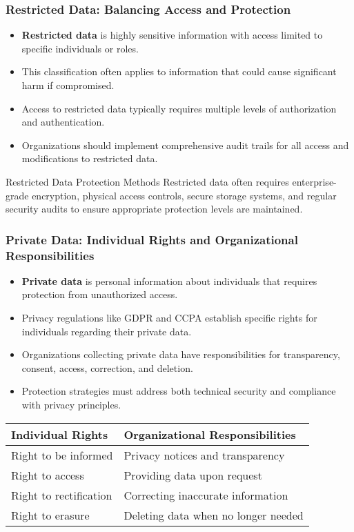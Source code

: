 \documentclass{beamer}
\begin{document}
\begin{frame}
\frametitle{Restricted Data: Balancing Access and Protection}
\begin{itemize}
\item \textbf{Restricted data} is highly sensitive information with access limited to specific individuals or roles.
\item This classification often applies to information that could cause significant harm if compromised.
\item Access to restricted data typically requires multiple levels of authorization and authentication.
\item Organizations should implement comprehensive audit trails for all access and modifications to restricted data.
\end{itemize}

\begin{exampleblock}{Restricted Data Protection Methods}
Restricted data often requires enterprise-grade encryption, physical access controls, secure storage systems, and regular security audits to ensure appropriate protection levels are maintained.
\end{exampleblock}
\end{frame}

\begin{frame}
\frametitle{Private Data: Individual Rights and Organizational Responsibilities}
\begin{itemize}
\item \textbf{Private data} is personal information about individuals that requires protection from unauthorized access.
\item Privacy regulations like GDPR and CCPA establish specific rights for individuals regarding their private data.
\item Organizations collecting private data have responsibilities for transparency, consent, access, correction, and deletion.
\item Protection strategies must address both technical security and compliance with privacy principles.
\end{itemize}

\begin{table}
\begin{tabular}{|l|l|}
\hline
\textbf{Individual Rights} & \textbf{Organizational Responsibilities} \\
\hline
Right to be informed & Privacy notices and transparency \\
\hline
Right to access & Providing data upon request \\
\hline
Right to rectification & Correcting inaccurate information \\
\hline
Right to erasure & Deleting data when no longer needed \\
\hline
\end{tabular}
\end{table}
\end{frame}
\end{document}
